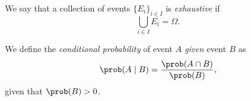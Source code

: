 \begin{definition}
We say that a collection of events $\{E_i\}_{i \in I}$ is \emph{exhaustive} if \[
    \bigcup_{i \in I} E_i = \Omega.
  \] 
\end{definition}

\begin{definition}
  We define the \emph{conditional probability} of event $A$ \emph{given} event $B$ as \[
    \prob(A \mid B) = \frac{\prob(A \cap B)}{\prob(B)},
  \] given that $\prob(B) > 0$.
\end{definition}


